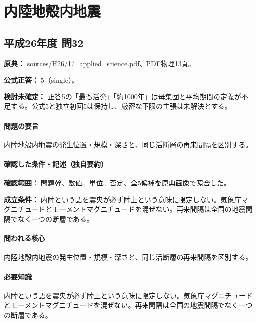 \section{内陸地殻内地震}

\subsection{平成26年度 問32}
\label{q:h26-reg-applied-32}

\noindent\textbf{原典：} sources/H26/17\_applied\_science.pdf、PDF物理13頁。

\textbf{公式正答：} 5（single）。

\par\textbf{検討未確定：} 正答5の「最も活発」「約1000年」は母集団と平均期間の定義が不足する。公式5と独立初回5は保持し、厳密な下限の主張は未解決とする。

\paragraph{問題の要旨} 内陸地殻内地震の発生位置・規模・深さと、同じ活断層の再来間隔を区別する。

\paragraph{確認した条件・記述（独自要約）}\mbox{}\par

\noindent\textbf{確認範囲：} 問題幹、数値、単位、否定、全5候補を原典画像で照合した。\par

\noindent\textbf{成立条件：} 内陸という語を震央が必ず陸上という意味に限定しない。気象庁マグニチュードとモーメントマグニチュードを混ぜない。再来間隔は全国の地震間隔でなく一つの断層である。\par

\paragraph{問われる核心} 内陸地殻内地震の発生位置・規模・深さと、同じ活断層の再来間隔を区別する。

\paragraph{必要知識} 内陸という語を震央が必ず陸上という意味に限定しない。気象庁マグニチュードとモーメントマグニチュードを混ぜない。再来間隔は全国の地震間隔でなく一つの断層である。

